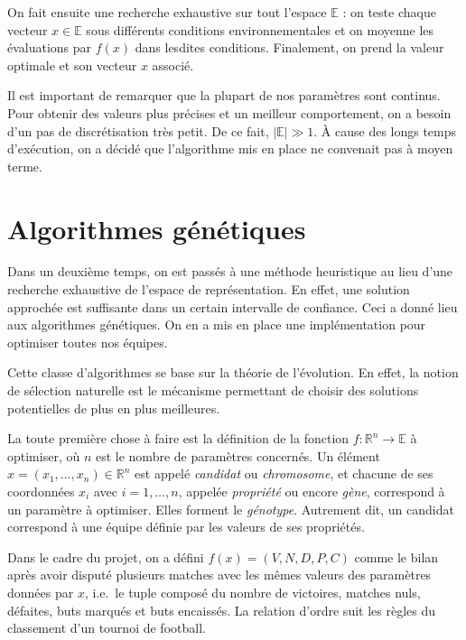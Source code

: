 \documentclass[12pt,a4paper]{article}
\begin{document}
On fait ensuite une recherche exhaustive sur tout l'espace $\mathbb{E}$ : 
on teste chaque vecteur $x \in \mathbb{E}$ sous diff\'erents conditions 
environnementales et on moyenne les \'evaluations par $f(x)$ dans lesdites 
conditions. Finalement, on prend la valeur optimale et son vecteur $x$ 
associ\'e.

Il est important de remarquer que la plupart de nos param\`etres sont continus. 
Pour obtenir des valeurs plus pr\'ecises et un meilleur comportement, on a 
besoin d'un pas de discr\'etisation tr\`es petit. De ce fait, 
$|\mathbb{E}| \gg 1$. \`A cause des longs temps d'ex\'ecution, on a 
d\'ecid\'e que l'algorithme mis en place ne convenait pas \`a moyen terme.

\section{Algorithmes g\'en\'etiques}
Dans un deuxi\`eme temps, on est pass\'es \`a une m\'ethode heuristique au 
lieu d'une recherche exhaustive de l'espace de repr\'esentation. En effet, 
une solution approch\'ee est suffisante dans un certain intervalle de 
confiance. Ceci a donn\'e lieu aux algorithmes g\'en\'etiques. On en a mis en 
place une impl\'ementation pour optimiser toutes nos \'equipes.

Cette classe d'algorithmes se base sur la th\'eorie de l'\'evolution. En effet, 
la notion de s\'election naturelle est le m\'ecanisme permettant de choisir des 
solutions potentielles de plus en plus meilleures.

La toute premi\`ere chose \`a faire est la d\'efinition de la fonction 
$f: \mathbb{R}^n \to \mathbb{E}$ \`a optimiser, o\`u $n$ est le nombre de 
param\`etres concern\'es. Un \'el\'ement $x=(x_1,\dotsc,x_n) \in \mathbb{R}^n$ 
est appel\'e {\itshape candidat} ou {\itshape chromosome}, et chacune de ses 
coordonn\'ees $x_i$ avec $i=1,\dotsc,n$, appel\'ee {\itshape propri\'et\'e} 
ou encore {\itshape g\`ene}, correspond \`a un param\`etre \`a optimiser. Elles 
forment le {\itshape g\'enotype}.
Autrement dit, un candidat correspond \`a une \'equipe d\'efinie par les valeurs
de ses propri\'et\'es.

Dans le cadre du projet, on a d\'efini $f(x)=(V,N,D,P,C)$ comme le 
bilan apr\`es avoir disput\'e plusieurs matches avec les m\^emes valeurs des 
param\`etres donn\'ees par $x$, i.e.\ le tuple compos\'e du nombre de 
victoires, matches nuls, d\'efaites, buts marqu\'es et buts encaiss\'es. La 
relation d'ordre suit les r\`egles du classement d'un tournoi de football.
\end{document}
